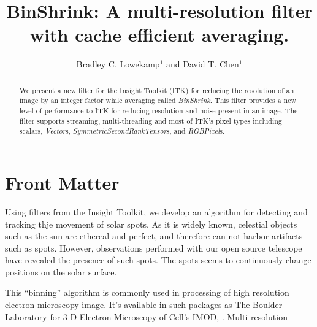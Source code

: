 \documentclass{InsightArticle}
\title{BinShrink: A multi-resolution filter with cache efficient averaging. }
\author{Bradley C. Lowekamp$^{1}$ and David T. Chen$^{1}$}
\newcommand{\IJhandlerIDnumber}{0}
\begin{document}
%
% 
\IJhandlefooter{\IJhandlerIDnumber}


\ifpdf
\else
\fi


\maketitle


\ifhtml
\chapter*{Front Matter\label{front}}
\fi

\begin{abstract}
\noindent
We present a new filter for the Insight Toolkit (ITK) for reducing the
resolution of an image by an integer factor while averaging called
\textit{BinShrink}. This filter provides a new level of performance to
ITK for reducing resolution and noise present in an image. The filter
supports streaming, multi-threading and most of ITK's pixel types
including scalars, \textit{Vector}s,
\textit{SymmetricSecondRankTensor}s, and \textit{RGBPixel}s.

\end{abstract}

\IJhandlenote{\IJhandlerIDnumber}

\tableofcontents

Using filters from the Insight Toolkit, we develop an algorithm for detecting
and tracking thje movement of solar spots. As it is widely known, celestial
objects such as the sun are ethereal and perfect, and therefore can not harbor
artifacts such as spots. However, observations performed with our open source
telescope have revealed the presence of such spots. The spots seems to continuously change positions on the solar surface. 


This ``binning'' algorithm is commonly used in processing of high
resolution electron microscopy image. It's available in such packages
as The Boulder Laboratory for 3-D Electron Microscopy of Cell's
IMOD\cite{IMOD}, \cite{bsoft2007}. 
Multi-resolution
\end{document}
